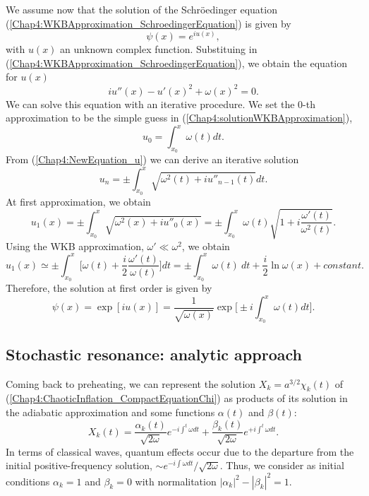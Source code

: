 \documentclass[11pt,a4paper,twoside]{book}
\begin{document}
We  assume now that the solution of the Schr\"{o}edinger equation (\ref{Chap4:WKBApproximation_SchroedingerEquation})  is given by 
\begin{equation}
	\psi(x)=e^{iu(x)},
\end{equation}
with  $ u(x) $ an unknown complex function. Substituing in (\ref{Chap4:WKBApproximation_SchroedingerEquation}), we obtain the equation for $ u(x) $
\begin{equation}
	\label{Chap4:NewEquation_u}
	iu''(x) - u'(x)^{2} + \omega(x)^{2} = 0.
\end{equation}
We can solve this equation with an iterative procedure. We set the $ 0 $-th approximation to be the simple guess in (\ref{Chap4:solutionWKBApproximation}),
\begin{equation}
	u_{0}=\int_{x_{0}}^{x} \omega(t) dt.
\end{equation}
From (\ref{Chap4:NewEquation_u}) we can derive an iterative solution
\begin{equation}
u_{n} = \pm \int_{x_{0}}^{x}\sqrt{\omega^{2}(t) + iu''_{n-1}(t)}dt.
\end{equation}
At first approximation, we obtain
\begin{equation}
	\label{Chap4:WKB_u1}
	u_{1}(x) = \pm \int_{x_{0}}^{x} \sqrt{\omega^{2}(x) + iu''_{0}(x)} = \pm \int_{x_{0}}^{x} \omega(t) \sqrt{1+i\frac{\omega'(t)}{\omega^{2}(t)}}.
\end{equation}
Using the WKB approximation, $ \omega'\ll \omega^{2} $, we obtain
\begin{equation}
u_{1}(x)\simeq \pm \int_{x_{0}}^{x} \Bigg[  \omega(t) + \frac{i}{2}\frac{\omega'(t)}{\omega(t)}\Bigg]dt =
 \pm \int_{x_{0}}^{x} \omega(t)\ dt + \frac{i}{2} \ln \omega(x) + constant.
\end{equation}
Therefore, the solution at first order is given by
\begin{equation}
\label{Chap4:Chap4:WKBFinalSolution}
\psi(x)=\exp[iu(x)]=\frac{1}{\sqrt{\omega(x)}}\exp \Bigg[\pm i\int_{x_0}^{x}\omega(t)dt\Bigg].
\end{equation}
\subsection{Stochastic resonance: analytic approach}
Coming back to preheating, we can represent the solution $ X_{k}=a^{3/2}\chi_{k}(t) $ of (\ref{Chap4:ChaoticInflation_CompactEquationChi}) as products of its solution in the adiabatic approximation and some functions $ \alpha (t) $ and $ \beta(t) $:
\begin{equation}
	\label{Chap4:SolutionAdiabaticForm}
	X_{k}(t) = \frac{\alpha_{k}(t)}{\sqrt{2\omega}}e^{-i\int^{t} \omega dt} 
	+ \frac{\beta_{k}(t)}{\sqrt{2\omega}}e^{+i\int^{t} \omega dt}.
\end{equation}
In terms of classical waves, quantum effects occur due to the departure from the initial positive-frequency solution, $ \sim e^{-i \int \omega dt}/\sqrt{2\omega} $. Thus, we consider as initial conditions $ \alpha_{k}=1 $ and $ \beta_{k}=0 $ with normalitation $ |\alpha_{k}|^{2} - |\beta_{k}|^{2} = 1 $.
\end{document}
